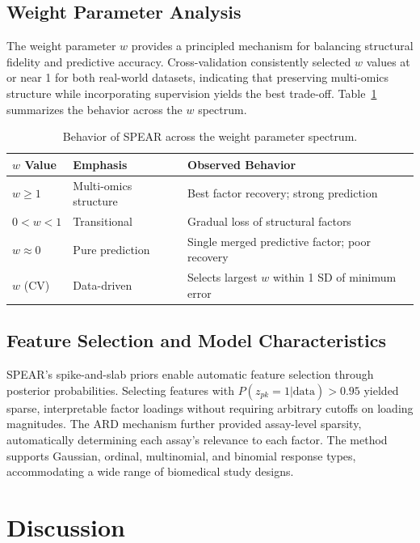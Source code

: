 \documentclass[11pt]{article}
\begin{document}
\subsection{Weight Parameter Analysis}

The weight parameter $w$ provides a principled mechanism for balancing structural fidelity and predictive accuracy. Cross-validation consistently selected $w$ values at or near 1 for both real-world datasets, indicating that preserving multi-omics structure while incorporating supervision yields the best trade-off. Table~\ref{tab:weight} summarizes the behavior across the $w$ spectrum.

\begin{table}[htbp]
\centering
\caption{Behavior of SPEAR across the weight parameter spectrum.}
\label{tab:weight}
\begin{tabular}{lll}
\toprule
\textbf{$w$ Value} & \textbf{Emphasis} & \textbf{Observed Behavior} \\
\midrule
$w \geq 1$ & Multi-omics structure & Best factor recovery; strong prediction \\
$0 < w < 1$ & Transitional & Gradual loss of structural factors \\
$w \approx 0$ & Pure prediction & Single merged predictive factor; poor recovery \\
$w$ (CV) & Data-driven & Selects largest $w$ within 1 SD of minimum error \\
\bottomrule
\end{tabular}
\end{table}

\subsection{Feature Selection and Model Characteristics}

SPEAR's spike-and-slab priors enable automatic feature selection through posterior probabilities. Selecting features with $P(z_{pk} = 1 | \text{data}) > 0.95$ yielded sparse, interpretable factor loadings without requiring arbitrary cutoffs on loading magnitudes. The ARD mechanism further provided assay-level sparsity, automatically determining each assay's relevance to each factor. The method supports Gaussian, ordinal, multinomial, and binomial response types, accommodating a wide range of biomedical study designs.

\section{Discussion}
\end{document}
